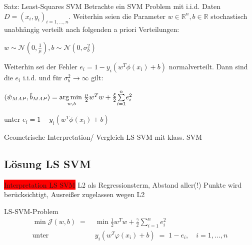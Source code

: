 \documentclass{beamer}
\begin{document}
{\begin{frame}
\begin{block}{Satz: Least-Squares SVM}
Betrachte ein SVM Problem mit i.i.d. Daten $D = (x_i,y_i)_{i=1,...,n}$. Weiterhin seien die Parameter $w\in \mathbb{R}^n, b\in \mathbb{R}$ stochastisch unabhängig verteilt nach folgenden a priori Verteilungen:

\begin{center}
$w \sim \mathcal{N}(0,\frac{1}{\mu}), b \sim \mathcal{N}(0, \sigma_b^2)$
\end{center}
 
Weiterhin sei der Fehler $e_i =  1 - y_i(w^T \phi(x_i) +b)$ normalverteilt. Dann
sind die $e_i$ i.i.d. und für $\sigma_b^2 \rightarrow \infty$ gilt:

\begin{center}
$(\hat{w}_{MAP},\hat{b}_{MAP})  = \underset{w,b}{\arg \min \hspace{0.1cm}} \frac{\mu}{2}w^Tw + \frac{\xi}{2}\underset{i=1}{\overset{n}{\sum}}e_i^2$

unter $e_i = 1 - y_i(w^T \phi(x_i) +b)$
\end{center}

\end{block}

\end{frame}

\begin{frame}
	Geometrische Interpretation/ Vergleich LS SVM mit klass. SVM
\end{frame}






\subsection{Lösung LS SVM}

\begin{frame}
	\colorbox{red}{Interpretation LS SVM}
	L2 als Regressionsterm, Abstand aller(!) Punkte wird berücksichtigt, Ausreißer zugelassen wegen L2\\
	
	\begin{block}{LS-SVM-Problem}
		\begin{align}
			\min \mathcal{J}(w,b)\;=\;&\min\frac{1}{2}w^Tw+\frac{\gamma}{2}\sum_{i=1}^{n}e_i^2\\
			\text{unter}\quad&y_i\left(w^T\varphi(x_i)+b\right)\;=\;1-e_i,\quad i=1,\dots,n
		\end{align}
	\end{block}
\end{frame}

}
\end{document}
